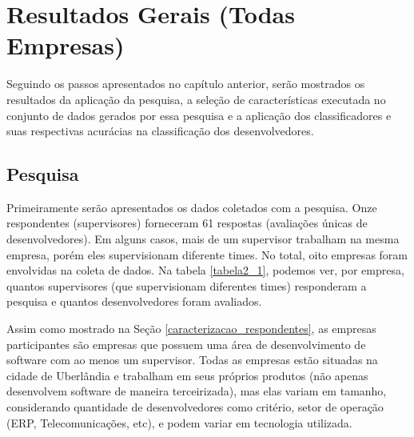 \chapter[Resultados Gerais]{Resultados Gerais (Todas Empresas)}\label{resultados_gerais}

Seguindo os passos apresentados no capítulo anterior, serão mostrados os resultados da aplicação da pesquisa, a seleção de características executada no conjunto de dados gerados por essa pesquisa e a aplicação dos classificadores e suas respectivas acurácias na classificação dos desenvolvedores.

\section{Pesquisa}\label{secao4.2}
Primeiramente serão apresentados os dados coletados com a pesquisa. Onze respondentes (supervisores) forneceram 61 respostas (avaliações únicas de desenvolvedores). Em alguns casos, mais de um supervisor trabalham na mesma empresa, porém eles supervisionam diferente times. No total, oito empresas foram envolvidas na coleta de dados. Na tabela \ref{tabela2_1}, podemos ver, por empresa, quantos supervisores (que supervisionam diferentes times) responderam a pesquisa e quantos desenvolvedores foram avaliados.

Assim como mostrado na Seção \ref{caracterizacao_respondentes}, as empresas participantes são empresas que possuem uma área de desenvolvimento de software com ao menos um supervisor. Todas as empresas estão situadas na cidade de Uberlândia e trabalham em seus próprios produtos (não apenas desenvolvem software de maneira terceirizada), mas elas variam em tamanho, considerando quantidade de desenvolvedores como critério, setor de operação (ERP, Telecomunicações, etc), e podem variar em tecnologia utilizada.


